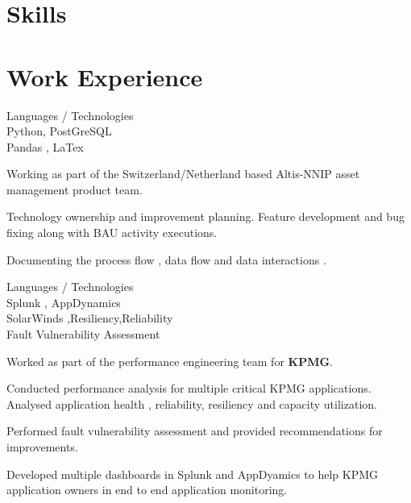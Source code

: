 \documentclass[a4,10pt]{cv4tw}
\begin{document}
\section{Skills}

\begin{skills}{}
\end{skills}


\section{Work Experience}
{Languages / Technologies \\Python, PostGreSQL\\ Pandas , LaTex }
	{
	\begin{missions}
  \item Working as part of the Switzerland/Netherland based Altis-NNIP asset management product team. 
  \item Technology ownership and improvement planning. Feature development and bug fixing along with  BAU activity executions.
  \item Documenting the process flow , data flow and data interactions .
	\end{missions}
}
{Languages / Technologies \\Splunk , AppDynamics \\  SolarWinds ,Resiliency,Reliability \\Fault Vulnerability Assessment}
	{
	\begin{missions}
  \item Worked as part of the performance engineering team for \textbf{KPMG}.
  \item Conducted performance analysis for multiple critical KPMG applications. Analysed  application health , reliability, resiliency and capacity utilization.
  \item Performed fault vulnerability assessment and provided recommendations for improvements.
  \item Developed multiple dashboards in Splunk and AppDyamics to help KPMG application owners in end to end application monitoring.
	\end{missions}
}
\end{document}
